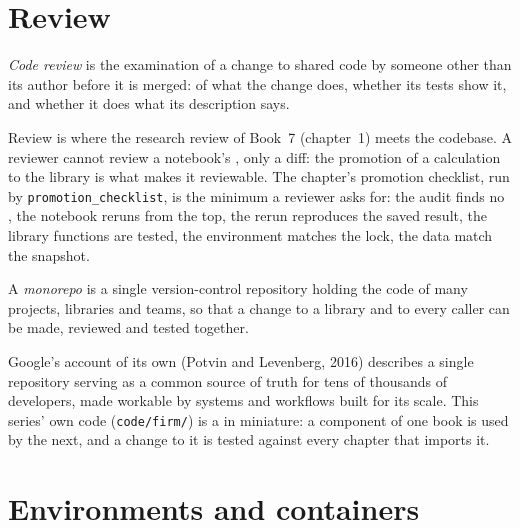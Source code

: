 \label{lst:pl:the-research-environment:library}

\section{Review}

\begin{definition}\label{def:pl:the-research-environment:review}
\emph{Code review} is the examination of a change to shared code by someone other than its author before it is merged:
of what the change does, whether its tests show it, and whether it does what its description says.
\end{definition}

Review is where the research review of Book~7 (chapter~1) meets the codebase. A reviewer cannot review a notebook's , only a
diff: the promotion of a calculation to the library is what makes it reviewable. The chapter's promotion checklist, run by
\texttt{promotion\_checklist}, is the minimum a reviewer asks for: the audit finds no , the notebook reruns from the top, the rerun
reproduces the saved result, the library functions are tested, the environment matches the lock, the data match the snapshot.

\begin{definition}[Monorepo]\label{def:pl:the-research-environment:monorepo}
A \emph{monorepo} is a single version-control repository holding the code of many projects, libraries and teams, so that a
change to a library and to every caller can be made, reviewed and tested together.
\end{definition}

Google's account of its own (Potvin and Levenberg, 2016) describes a single repository serving as a common source of truth for tens of
thousands of developers, made workable by systems and workflows built for its scale. This series' own code (\texttt{code/firm/}) is a  in miniature: a
component of one book is used by the next, and a change to it is tested against every chapter that imports it.

\section{Environments and containers}

